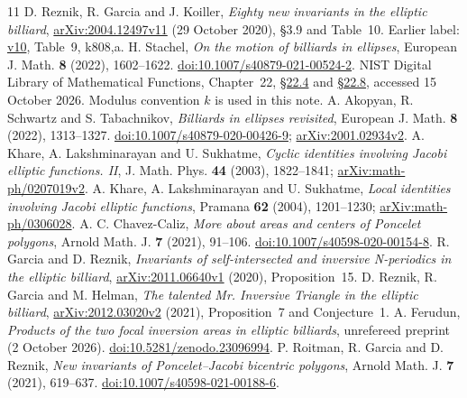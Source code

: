 \documentclass[11pt]{article}
\begin{document}
{\small
\begin{thebibliography}{11}
 D. Reznik, R. Garcia and J. Koiller, \emph{Eighty new invariants in the elliptic billiard}, \href{https://arxiv.org/abs/2004.12497v11}{arXiv:2004.12497v11} (29 October 2020), \S3.9 and Table~10. Earlier label: \href{https://arxiv.org/abs/2004.12497v10}{v10}, Table~9, k808,a.
 H. Stachel, \emph{On the motion of billiards in ellipses}, European J. Math. \textbf{8} (2022), 1602--1622. \href{https://doi.org/10.1007/s40879-021-00524-2}{doi:10.1007/s40879-021-00524-2}.
 NIST Digital Library of Mathematical Functions, Chapter~22, \href{https://dlmf.nist.gov/22.4}{\S22.4} and \href{https://dlmf.nist.gov/22.8}{\S22.8}, accessed 15 October 2026. Modulus convention $k$ is used in this note.
 A. Akopyan, R. Schwartz and S. Tabachnikov, \emph{Billiards in ellipses revisited}, European J. Math. \textbf{8} (2022), 1313--1327. \href{https://doi.org/10.1007/s40879-020-00426-9}{doi:10.1007/s40879-020-00426-9}; \href{https://arxiv.org/abs/2001.02934v2}{arXiv:2001.02934v2}.
 A. Khare, A. Lakshminarayan and U. Sukhatme, \emph{Cyclic identities involving Jacobi elliptic functions. II}, J. Math. Phys. \textbf{44} (2003), 1822--1841; \href{https://arxiv.org/abs/math-ph/0207019v2}{arXiv:math-ph/0207019v2}.
 A. Khare, A. Lakshminarayan and U. Sukhatme, \emph{Local identities involving Jacobi elliptic functions}, Pramana \textbf{62} (2004), 1201--1230; \href{https://arxiv.org/abs/math-ph/0306028}{arXiv:math-ph/0306028}.
 A. C. Chavez-Caliz, \emph{More about areas and centers of Poncelet polygons}, Arnold Math. J. \textbf{7} (2021), 91--106. \href{https://doi.org/10.1007/s40598-020-00154-8}{doi:10.1007/s40598-020-00154-8}.
 R. Garcia and D. Reznik, \emph{Invariants of self-intersected and inversive N-periodics in the elliptic billiard}, \href{https://arxiv.org/abs/2011.06640v1}{arXiv:2011.06640v1} (2020), Proposition~15.
 D. Reznik, R. Garcia and M. Helman, \emph{The talented Mr. Inversive Triangle in the elliptic billiard}, \href{https://arxiv.org/abs/2012.03020v2}{arXiv:2012.03020v2} (2021), Proposition~7 and Conjecture~1.
 A. Ferudun, \emph{Products of the two focal inversion areas in elliptic billiards}, unrefereed preprint (2 October 2026). \href{https://doi.org/10.5281/zenodo.23096994}{doi:10.5281/zenodo.23096994}.
 P. Roitman, R. Garcia and D. Reznik, \emph{New invariants of Poncelet--Jacobi bicentric polygons}, Arnold Math. J. \textbf{7} (2021), 619--637. \href{https://doi.org/10.1007/s40598-021-00188-6}{doi:10.1007/s40598-021-00188-6}.
\end{thebibliography}
}
\end{document}
